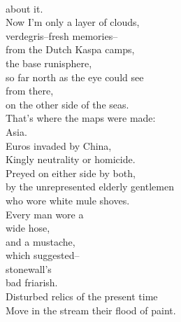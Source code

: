 \documentclass[smalldemyvopaper,11pt,twoside,onecolumn,openright,extrafontsizes]{memoir}
\begin{document}
\\about it.
\\Now I'm only a layer of clouds,
\\verdegris--fresh memories--
\\from the Dutch Kaspa camps,
\\the base runisphere,
\\so far north as the eye could see
\\from there,
\\on the other side of the seas.
\\That's where the maps were made:
\\Asia.
\\Euros invaded by China,
\\Kingly neutrality or homicide.
\\Preyed on either side by both,
\\by the unrepresented elderly gentlemen
\\who wore white mule shoves.
\\Every man wore a
\\wide hose,
\\and a mustache,
\\which suggested--
\\stonewall's
\\bad friarish.
\\Disturbed relics of the present time
\\Move in the stream their flood of paint.
\end{document}

